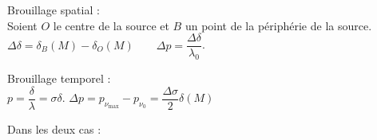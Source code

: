 ﻿\documentclass[a4paper]{article}
\begin{document}
\pagestyle{fancy}
\fancyhf{}
\setlength{\headheight}{15pt}

\begin{center}
	\large{}
\end{center}

Brouillage spatial : \\
Soient $O$ le centre de la source et $B$ un point de la périphérie de la source.\\
$\Delta\delta=\delta_B(M)-\delta_O(M)\qquad\Delta p=\dfrac{\Delta\delta}{\lambda_0}$.\par
Brouillage temporel :\\
$p=\dfrac{\delta}{\lambda}=\sigma\delta$.
$\Delta p=p_{\nu_{\text{max}}}-p_{\nu_0}=\dfrac{\Delta\sigma}{2}\delta(M)$
\par

Dans les deux cas :\\
\end{document}
